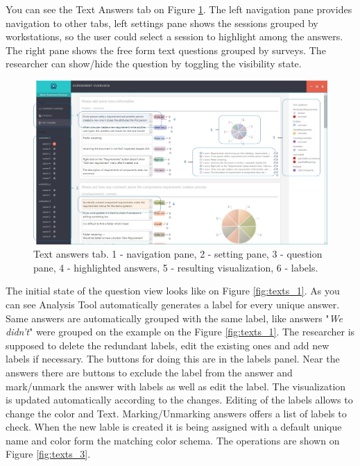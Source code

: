 You can see the Text Answers tab on Figure \ref{fig:texts_0}. The left navigation pane provides navigation to other tabs, left settings pane shows the sessions grouped by workstations, so the user could select a session to highlight among the answers. The right pane shows the free form text questions grouped by surveys. The researcher can show/hide the question by toggling the visibility state.\\

 \begin{figure}[htb]
 \centering
\includegraphics[width=\textwidth]{figures/texts_0.jpg}
\caption{Text answers tab. 1 - navigation pane, 2 - setting pane, 3 - question pane, 4 - highlighted answers, 5 - resulting visualization, 6 - labels.}
\label{fig:texts_0}
 \end{figure}
 
 The initial state of the question view looks like on Figure \ref{fig:texts_1}. As you can see Analysis Tool automatically generates a label for every unique answer. Same answers are automatically grouped with the same label, like answers "\textit{We didn't}" were grouped on the example on the Figure \ref{fig:texts_1}. The researcher is supposed to delete the redundant labels, edit the existing ones and add new labels if necessary. The buttons for doing this are in the labels panel. Near the answers there are buttons to exclude the label from the answer and mark/unmark the answer with labels as well as edit the label. The visualization is updated automatically according to the changes. Editing of the labels allows to change the color and Text. Marking/Unmarking answers offers a list of labels to check. When the new  lable is created it is being assigned with a default unique name and color form the matching color schema. The operations are shown on Figure \ref{fig:texts_3}. \\
 
